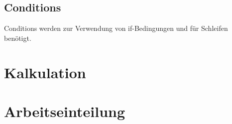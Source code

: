 \subsection{Conditions}
Conditions werden zur Verwendung von if-Bedingungen und für Schleifen benötigt.

\section{Kalkulation}


\section{Arbeitseinteilung}